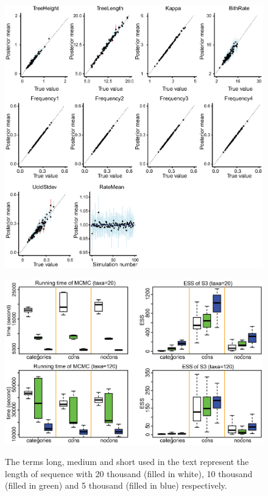 \documentclass{bmcart}
\begin{document}
\begin{backmatter}
\begin{figure}[h!]
\includegraphics[width=12cm]{Fig13-Calibrated.eps}\\
\caption{
             }
\label{LargeTree}
\end{figure}

\begin{figure}[h!]
\includegraphics[width=12cm]{Fig14-efficiency.eps}\\
\caption{
                   The terms long, medium and short used in the text represent the length of sequence with 20 thousand (filled in white), 10 thousand (filled in green) and 5 thousand (filled in blue) respectively.}
\label{eff_comp}
\end{figure}


\end{backmatter}
\end{document}
